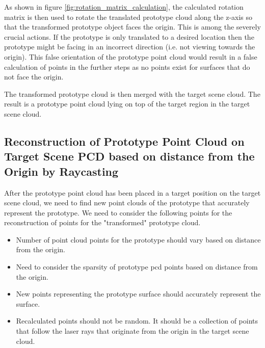 As shown in figure \ref{fig:rotation_matrix_calculation}, the calculated rotation matrix is then used to rotate the translated prototype cloud along the z-axis so that the transformed prototype object faces the origin. This is among the severely crucial actions. If the prototype is only translated to a desired location then the prototype might be facing in an incorrect direction (i.e. not viewing towards the origin). This false orientation of the prototype point cloud would result in a false calculation of points in the further steps as no points exist for surfaces that do not face the origin.

The transformed prototype cloud is then merged with the target scene cloud. The result is a prototype point cloud lying on top of the target region in the target scene cloud.


\subsection{Reconstruction of Prototype Point Cloud on Target Scene PCD based on distance from the Origin by Raycasting}

After the prototype point cloud has been placed in a target position on the target scene cloud, we need to find new point clouds of the prototype that accurately represent the prototype. We need to consider the following points for the reconstruction of points for the "transformed" prototype cloud.
\begin{itemize}
    \item Number of point cloud points for the prototype should vary based on distance from the origin.
    \item Need to consider the sparsity of prototype \acrshort{pcd} points based on distance from the origin.
    \item New points representing the prototype surface should accurately represent the surface.
    \item Recalculated points should not be random. It should be a collection of points that follow the laser rays that originate from the origin in the target scene cloud.
\end{itemize}

